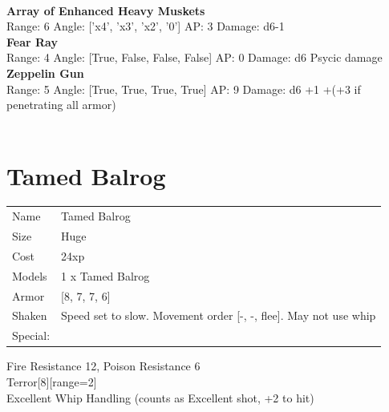 \ \\
{\bf Array of Enhanced Heavy Muskets } \\



Range: 6  Angle: ['x4', 'x3', 'x2', '0'] AP: 3 Damage: d6-1 \\




{\bf Fear Ray } \\



Range: 4  Angle: [True, False, False, False] AP: 0 Damage: d6 Psycic damage \\




{\bf Zeppelin Gun } \\



Range: 5  Angle: [True, True, True, True] AP: 9 Damage: d6 +1 +(+3 if penetrating all armor) \\




 
\ \\













\clearpage

\section{ Tamed Balrog }

\begin{tabular}{ll}
  Name & Tamed Balrog \\
  Size & Huge\\
  Cost & 24xp\\
  Models & 1 x Tamed Balrog\\
  Armor & [8, 7, 7, 6]\\
  Shaken & Speed set to slow. Movement order [-, -, flee]. May not use whip\\
  Special: \\
\end{tabular}

\noindent Fire Resistance 12, Poison Resistance 6\\ 
Terror[8][range=2]\\ 
Excellent Whip Handling (counts as Excellent shot, +2 to hit)\\ 


